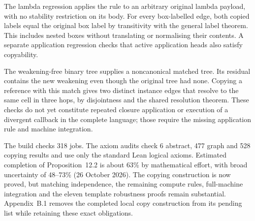 The lambda regression applies the rule to an arbitrary original lambda
payload, with no stability restriction on its body. For every box-labelled
edge, both copied labels equal the original box label by transitivity with
the general label theorem. This includes nested boxes without translating
or normalising their contents. A separate application regression checks
that active application heads also satisfy copyability.




The weakening-free binary tree supplies a noncanonical matched tree.
Its residual contains the new weakening even though the original tree had
none. Copying a reference with this match gives two distinct instance edges
that resolve to the same cell in three hops, by disjointness and the shared
resolution theorem. These checks do not yet constitute repeated closure
application or execution of a divergent callback in the complete language;
those require the missing application rule and machine integration.



The build checks 318 jobs. The axiom audits check 6 abstract, 477 graph and
528 copying results and use only the standard Lean logical axioms.
Estimated completion of Proposition~12.2 is about 63\% by mathematical effort,
with broad uncertainty of 48--73\% (26 October 2026). The copying construction
is now proved, but matching independence, the remaining compute rules,
full-machine integration and the eleven template robustness proofs remain
substantial. Appendix~B.1 removes the completed local copy construction
from its pending list while retaining these exact obligations.

